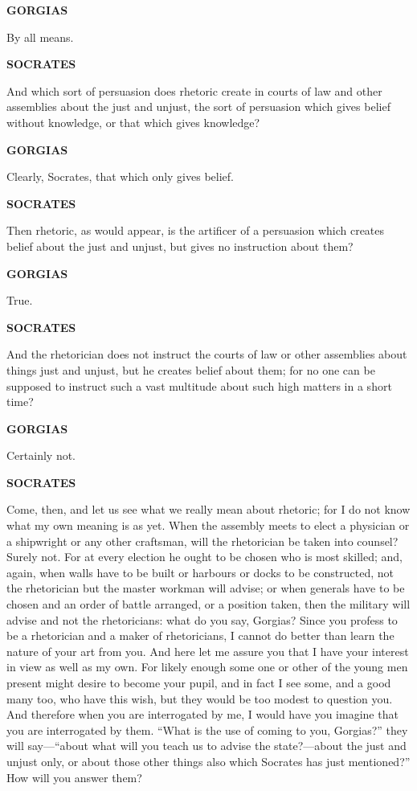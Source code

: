 \documentclass[11pt,letter]{article}
\begin{document}
\par \textbf{GORGIAS}
\par   By all means.

\par \textbf{SOCRATES}
\par   And which sort of persuasion does rhetoric create in courts of law and other assemblies about the just and unjust, the sort of persuasion which gives belief without knowledge, or that which gives knowledge?

\par \textbf{GORGIAS}
\par   Clearly, Socrates, that which only gives belief.

\par \textbf{SOCRATES}
\par   Then rhetoric, as would appear, is the artificer of a persuasion which creates belief about the just and unjust, but gives no instruction about them?

\par \textbf{GORGIAS}
\par   True.

\par \textbf{SOCRATES}
\par   And the rhetorician does not instruct the courts of law or other assemblies about things just and unjust, but he creates belief about them; for no one can be supposed to instruct such a vast multitude about such high matters in a short time?

\par \textbf{GORGIAS}
\par   Certainly not.

\par \textbf{SOCRATES}
\par   Come, then, and let us see what we really mean about rhetoric; for I do not know what my own meaning is as yet. When the assembly meets to elect a physician or a shipwright or any other craftsman, will the rhetorician be taken into counsel? Surely not. For at every election he ought to be chosen who is most skilled; and, again, when walls have to be built or harbours or docks to be constructed, not the rhetorician but the master workman will advise; or when generals have to be chosen and an order of battle arranged, or a position taken, then the military will advise and not the rhetoricians:  what do you say, Gorgias? Since you profess to be a rhetorician and a maker of rhetoricians, I cannot do better than learn the nature of your art from you. And here let me assure you that I have your interest in view as well as my own. For likely enough some one or other of the young men present might desire to become your pupil, and in fact I see some, and a good many too, who have this wish, but they would be too modest to question you. And therefore when you are interrogated by me, I would have you imagine that you are interrogated by them. “What is the use of coming to you, Gorgias?” they will say—“about what will you teach us to advise the state?—about the just and unjust only, or about those other things also which Socrates has just mentioned?” How will you answer them?
\end{document}
